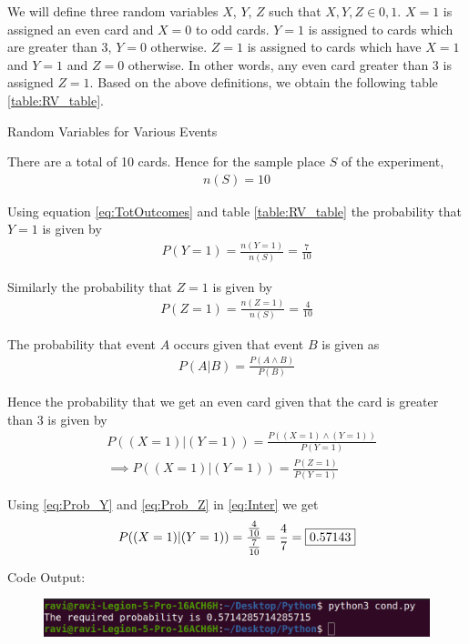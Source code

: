 \documentclass[journal,12pt,twocolumn]{IEEEtran}
\begin{document}
\solution

We will define three random variables $X$, $Y$, $Z$ such that $X, Y, Z \in {0, 1}$.
$X = 1$ is assigned an even card and $X = 0$ to odd cards.
$Y = 1$ is assigned to cards which are greater than 3, $Y = 0$ otherwise.
$Z = 1$ is assigned to cards which have $X = 1$ and $Y = 1$ and $Z = 0$ otherwise. In other words, any even card greater than 3 is assigned $Z = 1$.
Based on the above definitions, we obtain the following table
\eqref{table:RV_table}.
\begin{table}[!ht]
  \centering
  
  \caption{Random Variables for Various Events}
  \label{table:RV_table}	
\end{table}


There are a total of 10 cards. Hence for the sample place $S$ of the experiment,
\begin{align}
  n(S) = 10
  \label{eq:TotOutcomes}
\end{align}

Using equation
\eqref{eq:TotOutcomes}
and table
\eqref{table:RV_table}
the probability that $Y = 1$ is given by
\begin{align}
  P(Y = 1) = \frac{n(Y = 1)}{n(S)} = \frac{7}{10}
  \label{eq:Prob_Y}
\end{align}

Similarly the probability that $Z = 1$ is given by
\begin{align}
  P(Z = 1) = \frac{n(Z = 1)}{n(S)} = \frac{4}{10}
  \label{eq:Prob_Z}
\end{align}

The probability that event $A$ occurs given that event $B$ is given as
\begin{align}
  P(A|B) = \frac{P(A\wedge{}B)}{P(B)}
  \label{eq:Master}
\end{align}

Hence the probability that we get an even card given that the card is greater than 3 is given by
\begin{align}
  &P((X = 1)|(Y = 1)) = \frac{P((X = 1)\wedge{}(Y = 1))}{P(Y = 1)}
  \\
  &\implies P((X = 1)|(Y = 1)) = \frac{P(Z = 1)}{P(Y = 1)}
  \label{eq:Inter}
\end{align}

Using
\eqref{eq:Prob_Y}
and
\eqref{eq:Prob_Z}
in
\eqref{eq:Inter}
we get
\begin{align}
  P((X = 1)|(Y = 1)) = \frac{\frac{4}{10}}{\frac{7}{10}} = \frac{4}{7} = \fbox{0.57143}
\end{align}

Code Output:
\begin{figure}[!ht]
  \centering
  \includegraphics[width=\columnwidth]{../Figures/cond.png}
\end{figure}

  
\end{document}
